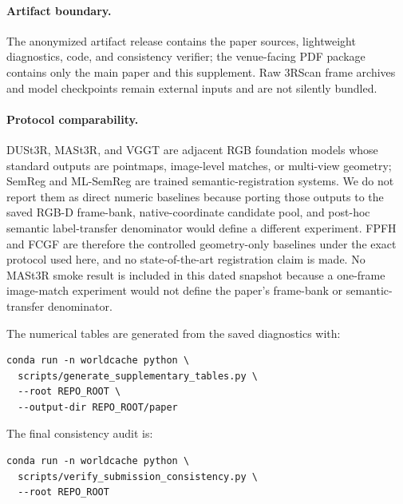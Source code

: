\documentclass[10pt,twocolumn]{article}
\begin{document}
\paragraph{Artifact boundary.}
The anonymized artifact release contains the paper sources, lightweight
diagnostics, code, and consistency verifier; the venue-facing PDF package
contains only the main paper and this supplement. Raw 3RScan frame archives
and model checkpoints remain external inputs and are not silently bundled.

\paragraph{Protocol comparability.}
DUSt3R, MASt3R, and VGGT are adjacent RGB foundation models whose standard
outputs are pointmaps, image-level matches, or multi-view geometry; SemReg and
ML-SemReg are trained semantic-registration systems. We do not report them as
direct numeric baselines because porting those outputs to the saved RGB-D
frame-bank, native-coordinate candidate pool, and post-hoc semantic
label-transfer denominator would define a different experiment. FPFH and FCGF
are therefore the controlled geometry-only baselines under the exact protocol
used here, and no state-of-the-art registration claim is made. No MASt3R smoke
result is included in this dated snapshot because a one-frame image-match
experiment would not define the paper's frame-bank or semantic-transfer
denominator.

The numerical tables are generated from the saved diagnostics with:

\begin{verbatim}
conda run -n worldcache python \
  scripts/generate_supplementary_tables.py \
  --root REPO_ROOT \
  --output-dir REPO_ROOT/paper
\end{verbatim}

The final consistency audit is:

\begin{verbatim}
conda run -n worldcache python \
  scripts/verify_submission_consistency.py \
  --root REPO_ROOT
\end{verbatim}
\end{document}
